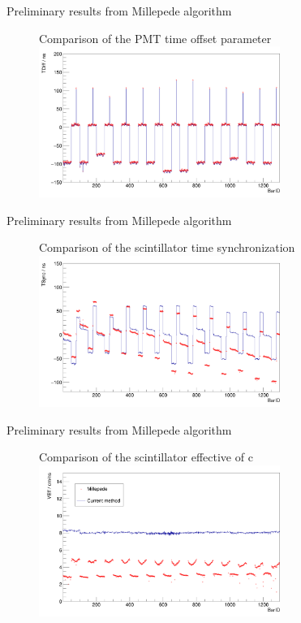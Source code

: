 \documentclass{ikpKoeln}
\begin{document}
\begin{frame}{Preliminary results from Millepede algorithm}
	\begin{figure}
		\centering
		Comparison of the PMT time offset parameter
		\includegraphics[width = 0.7\textwidth]{neulandMeeting/t_diff.png}
	\end{figure}
\end{frame}
\begin{frame}{Preliminary results from Millepede algorithm}
	\begin{figure}
		\centering
		Comparison of the scintillator time synchronization
		\includegraphics[width = 0.7\textwidth]{neulandMeeting/tsync.png}
	\end{figure}
\end{frame}
\begin{frame}{Preliminary results from Millepede algorithm}
	\begin{figure}
		\centering
		Comparison of the scintillator effective of c
		\includegraphics[width = 0.7\textwidth]{neulandMeeting/effective_c.png}
	\end{figure}
\end{frame}
\end{document}
